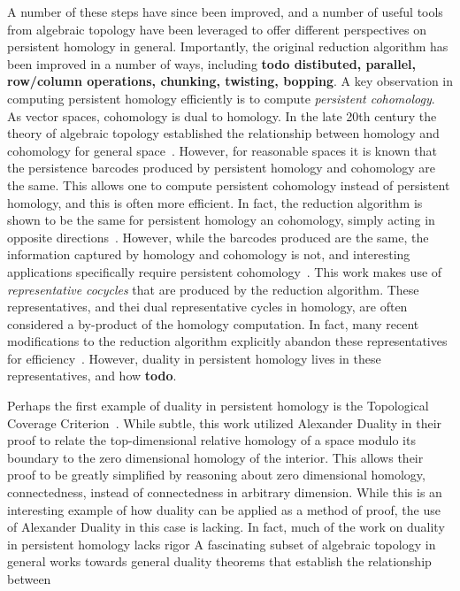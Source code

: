 A number of these steps have since been improved, and a number of useful tools from algebraic topology have been leveraged to offer different perspectives on persistent homology in general.
Importantly, the original reduction algorithm has been improved in a number of ways, including \textbf{todo distibuted, parallel, row/column operations, chunking, twisting, bopping}.
A key observation in computing persistent homology efficiently is to compute \emph{persistent cohomology}.
As vector spaces, cohomology is dual to homology.
In the late 20th century the theory of algebraic topology established the relationship between homology and cohomology for general space~\cite{spanier66algebraic,munkres84elements,bredon93,hatcher01}.
However, for reasonable spaces it is known that the persistence barcodes produced by persistent homology and cohomology are the same.
This allows one to compute persistent cohomology instead of persistent homology, and this is often more efficient.
In fact, the reduction algorithm is shown to be the same for persistent homology an cohomology, simply acting in opposite directions~\cite{desilva11duality}.
However, while the barcodes produced are the same, the information captured by homology and cohomology is not, and interesting applications specifically require persistent cohomology~\cite{desilva11circular}.
This work makes use of \emph{representative cocycles} that are produced by the reduction algorithm.
These representatives, and thei dual representative cycles in homology, are often considered a by-product of the homology computation.
In fact, many recent modifications to the reduction algorithm explicitly abandon these representatives for efficiency~\cite{todo}.
However, duality in persistent homology lives in these representatives, and how \textbf{todo}.

Perhaps the first example of duality in persistent homology is the Topological Coverage Criterion~\cite{desilva07coverage}.
While subtle, this work utilized Alexander Duality in their proof to relate the top-dimensional relative homology of a space modulo its boundary to the zero dimensional homology of the interior.
This allows their proof to be greatly simplified by reasoning about zero dimensional homology, connectedness, instead of connectedness in arbitrary dimension.
While this is an interesting example of how duality can be applied as a method of proof, the use of Alexander Duality in this case is lacking.
In fact, much of the work on duality in persistent homology lacks rigor
A fascinating subset of algebraic topology in general works towards general duality theorems that establish the relationship between

